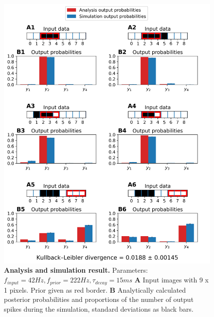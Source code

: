 \begin{figure}
  \includegraphics[width=\linewidth]{figures/1D/1D_42_222_15.png}
     \caption{\textbf{Analysis and simulation result. } Parameters: $f_{input} = 42 Hz, f_{prior} = 222 Hz, \tau_{decay} = 15 ms$ \textbf{A} Input images with 9 x 1 pixels. Prior given as red border. \textbf{B} Analytically calculated posterior probabilities and proportions of the number of output spikes during the simulation, standard deviations as black bars.}
  \label{fig:1D_42_222_15}
\end{figure}

